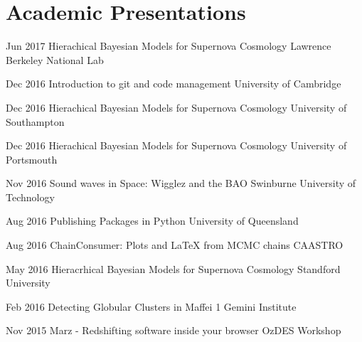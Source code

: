 \documentclass[]{friggeri-cv} %
\begin{document}
\section{Academic Presentations}
\begin{entrylist}
\end{entrylist}
\begin{entrylist}
\end{entrylist}
\begin{entrylist}
\end{entrylist}
\begin{entrylist}
	\entryInlineSmall
	{Jun 2017}
	{Hierachical Bayesian Models for Supernova Cosmology}
	{Lawrence Berkeley National Lab}
	{}
\end{entrylist}
\begin{entrylist}
	\entryInlineSmall
	{Dec 2016}
	{Introduction to git and code management}
	{University of Cambridge}
	{}
\end{entrylist}
\begin{entrylist}
	\entryInlineSmall
	{Dec 2016}
	{Hierachical Bayesian Models for Supernova Cosmology}
	{University of Southampton}
	{}
\end{entrylist}
\begin{entrylist}
	\entryInlineSmall
	{Dec 2016}
	{Hierachical Bayesian Models for Supernova Cosmology}
	{University of Portsmouth}
	{}
\end{entrylist}
\begin{entrylist}
	\entryInlineSmall
	{Nov 2016}
	{Sound waves in Space: Wigglez and the BAO}
	{Swinburne University of Technology}
	{}
\end{entrylist}
\begin{entrylist}
	\entryInlineSmall
	{Aug 2016}
	{Publishing Packages in Python}
	{University of Queensland}
	{}
\end{entrylist}
\begin{entrylist}
	\entryInlineSmall
	{Aug 2016}
	{ChainConsumer: Plots and LaTeX from MCMC chains}
	{CAASTRO}
	{}
\end{entrylist}
\begin{entrylist}
	\entryInlineSmall
	{May 2016}
	{Hieracrhical Bayesian Models for Supernova Cosmology}
	{Standford University}
	{}
\end{entrylist}
\begin{entrylist}
	\entryInlineSmall
	{Feb 2016}
	{Detecting Globular Clusters in Maffei 1}
	{Gemini Institute}
	{}
\end{entrylist}
\begin{entrylist}
	\entryInlineSmall
	{Nov 2015}
	{Marz - Redshifting software inside your browser}
	{OzDES Workshop}
	{}
\end{entrylist}
\end{document}
